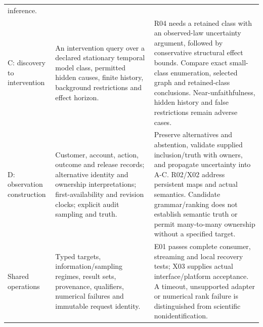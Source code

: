 \documentclass[
  11pt,
  a4paper,
]{article}
\begin{document}
\begin{longtable}[]{@{}lll@{}}
\begin{minipage}[t]{0.30\columnwidth}
inference.\strut
\end{minipage}\tabularnewline
\begin{minipage}[t]{0.30\columnwidth}\raggedright
C: discovery to intervention\strut
\end{minipage} & \begin{minipage}[t]{0.30\columnwidth}\raggedright
An intervention query over a declared stationary temporal model class,
permitted hidden causes, finite history, background restrictions and
effect horizon.\strut
\end{minipage} & \begin{minipage}[t]{0.30\columnwidth}\raggedright
R04 needs a retained class with an observed-law uncertainty argument,
followed by conservative structural effect bounds. Compare exact
small-class enumeration, selected graph and retained-class conclusions.
Near-unfaithfulness, hidden history and false restrictions remain
adverse cases.\strut
\end{minipage}\tabularnewline
\begin{minipage}[t]{0.30\columnwidth}\raggedright
D: observation construction\strut
\end{minipage} & \begin{minipage}[t]{0.30\columnwidth}\raggedright
Customer, account, action, outcome and release records; alternative
identity and ownership interpretations; first-availability and revision
clocks; explicit audit sampling and truth.\strut
\end{minipage} & \begin{minipage}[t]{0.30\columnwidth}\raggedright
Preserve alternatives and abstention, validate supplied inclusion/truth
with owners, and propagate uncertainty into A-C. R02/X02 address
persistent maps and actual semantics. Candidate grammar/ranking does not
establish semantic truth or permit many-to-many ownership without a
specified target.\strut
\end{minipage}\tabularnewline
\begin{minipage}[t]{0.30\columnwidth}\raggedright
Shared operations\strut
\end{minipage} & \begin{minipage}[t]{0.30\columnwidth}\raggedright
Typed targets, information/sampling regimes, result sets, provenance,
qualifiers, numerical failures and immutable request identity.\strut
\end{minipage} & \begin{minipage}[t]{0.30\columnwidth}\raggedright
E01 passes complete consumer, streaming and local recovery tests; X03
supplies actual interface/platform acceptance. A timeout, unsupported
adapter or numerical rank failure is distinguished from scientific
nonidentification.\strut
\end{minipage}\tabularnewline
\bottomrule
\end{longtable}
\end{document}
